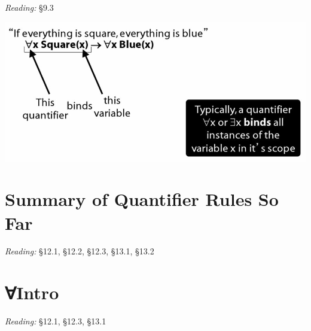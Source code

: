 \documentclass[12pt]{extarticle}
\begin{document}
\begin{multicols*}{3}
\emph{Reading:} §9.3
 
\begin{center}
\includegraphics[scale=0.3]{img/quantifiers_scope.png}
\end{center}
 
 
\section{Summary of Quantifier Rules So Far}
 
\emph{Reading:} §12.1, §12.2, §12.3, §13.1, §13.2
 
 
 
\section{∀Intro}
 
\emph{Reading:} §12.1, §12.3, §13.1
 

\end{multicols*}
\end{document}
